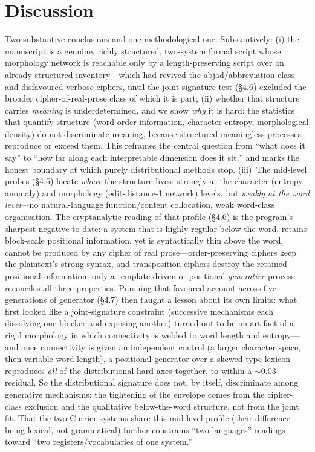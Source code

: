 \documentclass[11pt]{article}
\begin{document}
\section{Discussion}
Two substantive conclusions and one methodological one. Substantively: (i) the
manuscript is a genuine, richly structured, two-system formal script whose morphology
network is reachable only by a length-preserving script over an already-structured
inventory---which had revived the abjad/abbreviation class and disfavoured verbose
ciphers, until the joint-signature test (\S4.6) excluded the broader
cipher-of-real-prose class of which it is part; (ii) whether that structure carries
\emph{meaning} is underdetermined, and we show \emph{why} it is hard: the statistics
that quantify structure (word-order information, character entropy, morphological
density) do not discriminate meaning, because structured-meaningless processes reproduce
or exceed them. This reframes the central question from ``what does it say'' to ``how far
along each interpretable dimension does it sit,'' and marks the honest boundary at which
purely distributional methods stop. (iii)~The mid-level probes (\S4.5) locate
\emph{where} the structure lives: strongly at the character (entropy anomaly) and
morphology (edit-distance-1 network) levels, but \emph{weakly at the word level}---no
natural-language function/content collocation, weak word-class organisation. The
cryptanalytic reading of that profile (\S4.6) is the program's sharpest negative to
date: a system that is highly regular below the word, retains block-scale positional
information, yet is syntactically thin above the word, cannot be produced by any cipher
of real prose---order-preserving ciphers keep the plaintext's strong syntax, and
transposition ciphers destroy the retained positional information; only a template-driven
or positional \emph{generative} process reconciles all three properties. Pursuing that
favoured account across five generations of generator (\S4.7) then taught a lesson about
its own limits: what first looked like a joint-signature constraint (successive mechanisms
each dissolving one blocker and exposing another) turned out to be an artifact of a
rigid morphology in which connectivity is welded to word length and entropy---and once
connectivity is given an independent control (a larger character space, then variable word
length), a positional generator over a skewed type-lexicon reproduces \emph{all} of the
distributional hard axes together, to within a $\sim\!0.03$ residual. So the distributional
signature does not, by itself, discriminate among generative mechanisms; the tightening of
the envelope comes from the cipher-class exclusion and the qualitative below-the-word
structure, not from the joint fit. That the two Currier systems share this mid-level profile
(their difference being lexical, not grammatical) further constrains ``two languages''
readings toward ``two registers/vocabularies of one system.''
\end{document}
